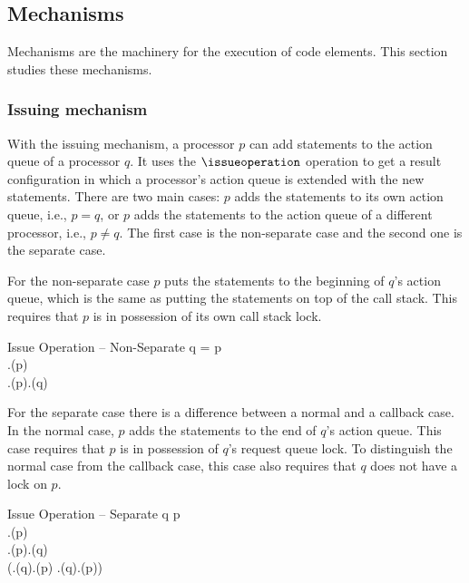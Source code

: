 \subsection{Mechanisms}\label{sec:mechanisms}
Mechanisms are the machinery for the execution of code elements. This section studies these mechanisms.

\subsubsection{Issuing mechanism}
With the issuing mechanism, a processor $p$ can add statements to the action queue of a processor $q$. It uses the $\issueoperation$ operation to get a result configuration in which a processor's action queue is extended with the new statements. There are two main cases: $p$ adds the statements to its own action queue, i.e., $p = q$, or $p$ adds the statements to the action queue of a different processor, i.e., $p \neq q$. The first case is the non-separate case and the second one is the separate case.

For the non-separate case $p$ puts the statements to the beginning of $q$'s action queue, which is the same as putting the statements on top of the call stack. This requires that $p$ is in possession of its own call stack lock.

\singlelineinferencerule
	{Issue Operation -- Non-Separate}
	{
		q = p \\
		\neg \state.\arelockspassedfeature(p) \\
		\state.\callstacklocksfeature(p).\containsfeature(q)
	}
	{}
	{}
 
For the separate case there is a difference between a normal and a callback case. In the normal case, $p$ adds the statements to the end of $q$'s action queue. This case requires that $p$ is in possession of $q$'s request queue lock. To distinguish the normal case from the callback case, this case also requires that $q$ does not have a lock on $p$.

\singlelineinferencerule
	{Issue Operation -- Separate}
	{
		q \neq p \\
		\neg \state.\arelockspassedfeature(p) \\
		\state.\requestqueuelocksfeature(p).\containsfeature(q) \\
		\neg (\state.\requestqueuelocksfeature(q).\containsfeature(p) \vee \state.\callstacklocksfeature(q).\containsfeature(p))
	}
	{}
	{}
 
